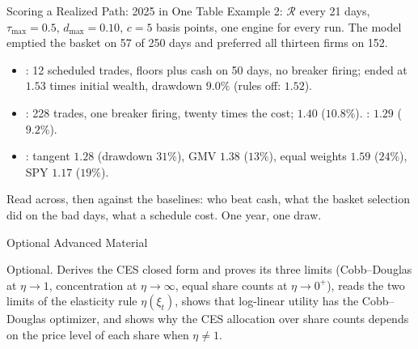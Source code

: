 \documentclass[aspectratio=169,11pt]{beamer}
\newcommand{\Rset}{\mathcal{R}}
\begin{document}
\begin{frame}{Scoring a Realized Path: 2025 in One Table}
  Example 2: $\Rset$ every 21 days, $\tau_{\max}=0.5$, $d_{\max}=0.10$, $c=5$
  basis points, one engine for every run. The model emptied the basket on 57 of
  250 days and preferred all thirteen firms on 152.
  \begin{itemize}\setlength{\itemsep}{0.35em}
    \item {}: 12 scheduled trades, floors plus cash on
      50 days, no breaker firing; ended at $1.53$ times initial wealth, drawdown
      $9.0\%$ (rules off: $1.52$).
    \item {}: 228 trades, one breaker firing, twenty
      times the cost; $1.40$ ($10.8\%$). :
      $1.29$ ($9.2\%$).
    \item {}: tangent $1.28$ (drawdown $31\%$), GMV $1.38$
      ($13\%$), equal weights $1.59$ ($24\%$), SPY $1.17$ ($19\%$).
  \end{itemize}
  Read across, then against the baselines: who beat cash, what the basket
  selection did on the bad days, what a schedule cost. One year, one draw.
\end{frame}

\begin{frame}{Optional Advanced Material}
  \vspace{0.4em}
  {\normalsize\textbf{} \par
  }

  \vspace{0.7em}
  Optional. Derives the CES closed form and proves its
  three limits (Cobb--Douglas at $\eta\to1$, concentration at $\eta\to\infty$,
  equal share counts at $\eta\to0^+$), reads the two limits of the elasticity
  rule $\eta(\xi_t)$, shows that log-linear utility has the Cobb--Douglas
  optimizer, and shows why the CES allocation over share counts depends on the
  price level of each share when $\eta\ne1$.
\end{frame}
\end{document}
